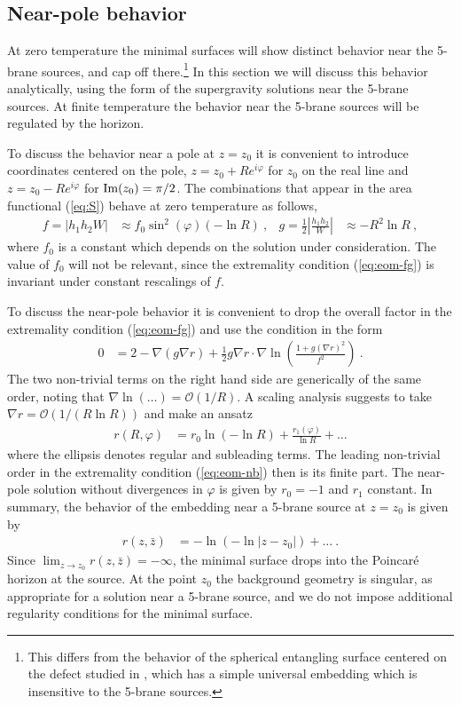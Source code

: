 \documentclass[aps,prd,11pt,notitlepage,longbibliography,nofootinbib,tightenlines,preprintnumbers]{revtex4-1}
\def\Im{\mathop{\rm Im}}
\begin{document}
\subsection{Near-pole behavior}\label{sec:near-pole}

At zero temperature the minimal surfaces will show distinct behavior near the 5-brane sources, and cap off there.\footnote{This differs from the behavior of the spherical entangling surface centered on the defect studied in \cite{VanRaamsdonk:2020djx}, which has a simple universal embedding which is insensitive to the 5-brane sources.}
In this section we will discuss this behavior analytically, using the form of the supergravity solutions near the 5-brane sources.
At finite temperature the behavior near the 5-brane sources will be regulated by the horizon.

To discuss the behavior near a pole at $z=z_0$ it is convenient to introduce coordinates centered on the pole, 
$z=z_0+R e^{i\varphi}$ for $z_0$ on the real line and $z=z_0-Re^{i\varphi}$ for $\Im(z_0)=\pi/2$.
The combinations that appear in the area functional (\ref{eq:S}) behave at zero temperature as follows,
\begin{align}
	f=|h_1h_2 W|&\approx f_0\sin^2(\varphi)(-\ln R)~,
	&
	g=\frac{1}{2}\left|\frac{h_1h_2}{W}\right|&\approx -R^2\ln R~,
\end{align}
where $f_0$ is a constant which depends on the solution under consideration. 
The value of $f_0$ will not be relevant, since the extremality condition (\ref{eq:eom-fg}) is invariant under constant rescalings of $f$.


To discuss the near-pole behavior it is convenient to drop the overall factor in the extremality condition (\ref{eq:eom-fg}) and use the condition in the form
\begin{align}\label{eq:eom-nb}
	0&=2-\nabla\left(g\nabla r\right)+\frac{1}{2}g\nabla r\cdot \nabla\ln\left(\frac{1+g(\nabla r)^2}{f^2}\right)~.
\end{align}
The two non-trivial terms on the right hand side are generically of the same order, noting that $\nabla \ln(\ldots)=\mathcal O(1/R)$.
A scaling analysis suggests to take $\nabla r=\mathcal O(1/(R\ln R))$ and make an ansatz
\begin{align}
	r(R,\varphi)&= r_0\ln(-\ln R)+\frac{r_1(\varphi)}{\ln R}+\ldots
\end{align}
where the ellipsis denotes regular and subleading terms.
The leading non-trivial order in the extremality condition (\ref{eq:eom-nb}) then is its finite part. 
The near-pole solution without divergences in $\varphi$ is given by $r_0=-1$ and $r_1$ constant.
In summary, the behavior of the embedding near a 5-brane source at $z=z_0$ is given by
\begin{align}\label{eq:r-near-pole}
	r(z,\bar z)&= -\ln(-\ln |z-z_0|)+\ldots~.
\end{align}
Since $\lim_{z\rightarrow z_0}r(z,\bar z)=-\infty$, the minimal surface drops into the Poincar\'e horizon at the source.
At the point $z_0$ the background geometry is singular, as appropriate for a solution near a 5-brane source, and we do not impose additional regularity conditions for the minimal surface.
\end{document}
